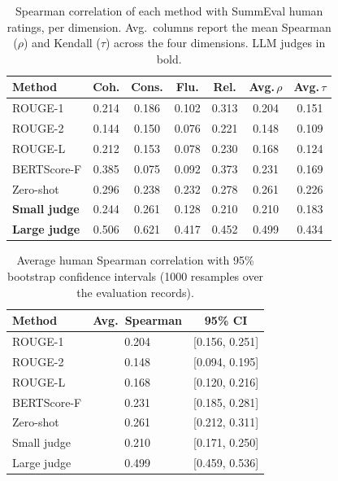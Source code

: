 \begin{table}[t]
\centering
\caption{Spearman correlation of each method with SummEval human ratings, per dimension. Avg.\ columns report the mean Spearman ($\rho$) and Kendall ($\tau$) across the four dimensions. LLM judges in bold.}
\label{tab:correlation}
\begin{tabular}{lcccccc}
\toprule
Method & Coh. & Cons. & Flu. & Rel. & Avg.\,$\rho$ & Avg.\,$\tau$ \\
\midrule
ROUGE-1 & 0.214 & 0.186 & 0.102 & 0.313 & 0.204 & 0.151 \\
ROUGE-2 & 0.144 & 0.150 & 0.076 & 0.221 & 0.148 & 0.109 \\
ROUGE-L & 0.212 & 0.153 & 0.078 & 0.230 & 0.168 & 0.124 \\
BERTScore-F & 0.385 & 0.075 & 0.092 & 0.373 & 0.231 & 0.169 \\
Zero-shot & 0.296 & 0.238 & 0.232 & 0.278 & 0.261 & 0.226 \\
\textbf{Small judge} & 0.244 & 0.261 & 0.128 & 0.210 & 0.210 & 0.183 \\
\textbf{Large judge} & 0.506 & 0.621 & 0.417 & 0.452 & 0.499 & 0.434 \\
\bottomrule
\end{tabular}
\end{table}

\begin{table}[t]
\centering
\caption{Average human Spearman correlation with 95\% bootstrap confidence intervals (1000 resamples over the evaluation records).}
\label{tab:bootstrap}
\begin{tabular}{lcc}
\toprule
Method & Avg.\ Spearman & 95\% CI \\
\midrule
ROUGE-1 & 0.204 & [0.156, 0.251] \\
ROUGE-2 & 0.148 & [0.094, 0.195] \\
ROUGE-L & 0.168 & [0.120, 0.216] \\
BERTScore-F & 0.231 & [0.185, 0.281] \\
Zero-shot & 0.261 & [0.212, 0.311] \\
Small judge & 0.210 & [0.171, 0.250] \\
Large judge & 0.499 & [0.459, 0.536] \\
\bottomrule
\end{tabular}
\end{table}

